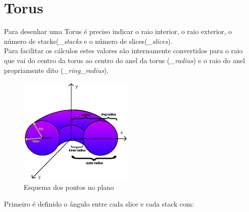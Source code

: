 \documentclass[a4paper]{report}
\begin{document}
\section{Torus}
Para desenhar uma Torus é preciso indicar o raio interior, o raio exterior, o
número de stacks(\textit{\_stacks} e o número de slices(\textit{\_slices}).\\
Para facilitar os cálculos estes valores são internamente convertidos para o
raio que vai do centro da torus ao centro do anel da torus (\textit{\_radius}) e
o raio do anel propriamente dito (\textit{\_ring\_radius}).

\begin{figure}[H]
    \centering 
    \includegraphics[width=0.5\textwidth]{images/torus_points.png}
    \caption{Esquema dos pontos no plano}
\end{figure}
Primeiro é definido o ângulo entre cada slice e cada stack com:
\end{document}
